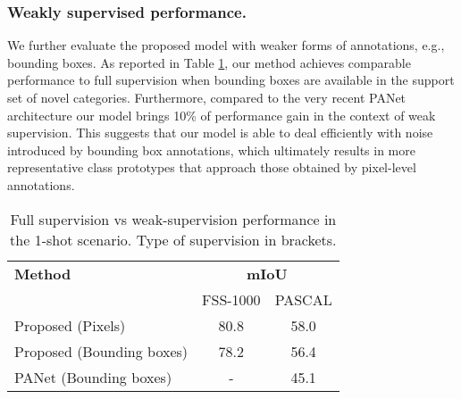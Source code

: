 \documentclass[runningheads]{llncs}
\begin{document}
\subsubsection{Weakly supervised performance.}
\label{sssec:weak_perf}
We further evaluate the proposed model with weaker forms of annotations, e.g., bounding boxes. As reported in Table \ref{tab:weakSup}, our method achieves comparable performance to full supervision when bounding boxes are available in the support set of novel categories. Furthermore, compared to the very recent PANet architecture \cite{wang2019panet} our model brings 10\% of performance gain in the context of weak supervision. This suggests that our model is able to deal efficiently with noise introduced by bounding box annotations, which ultimately results in more representative class prototypes that approach those obtained by pixel-level annotations. 


\begin{table}[h!]
\footnotesize
\centering
\caption{Full supervision vs weak-supervision performance in the 1-shot scenario. Type of supervision in brackets.}
\begin{tabular}{lc|c}
\toprule
\bf  Method   & \multicolumn{2}{c}{\textbf{mIoU}} \\
         & FSS-1000     & PASCAL    \\
         \midrule
Proposed (Pixels)  &  80.8 & 58.0\\
\midrule
Proposed (Bounding boxes)  & 78.2  & 56.4\\
PANet \cite{wang2019panet} (Bounding boxes)  & -  & 45.1\\

\bottomrule
\end{tabular}
    \label{tab:weakSup}
    
\end{table}


















\setlength{\tabcolsep}{1.4pt}
\end{document}
